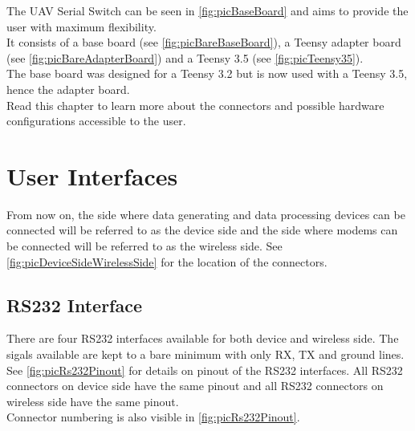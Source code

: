%
\label{sec:txtHwConfig}
%
%
%
%
The UAV Serial Switch can be seen in \autoref{fig:picBaseBoard} and aims to provide the user with maximum flexibility.\\
It consists of a base board (see \autoref{fig:picBareBaseBoard}), a Teensy adapter board (see \autoref{fig:picBareAdapterBoard}) and a Teensy 3.5 (see \autoref{fig:picTeensy35}).\\
The base board was designed for a Teensy 3.2 but is now used with a Teensy 3.5, hence the adapter board.\\
Read this chapter to learn more about the connectors and possible hardware configurations accessible to the user.
%
%
%
%
%
%
%
\section{User Interfaces}
%
From now on, the side where data generating and data processing devices can be connected will be referred to as the device side and the side where modems can be connected will be referred to as the wireless side. See \autoref{fig:picDeviceSideWirelessSide} for the location of the connectors.
%
%
\subsection{RS232 Interface}
%
There are four RS232 interfaces available for both device and wireless side. The sigals available are kept to a bare minimum with only RX, TX and ground lines. See \autoref{fig:picRs232Pinout} for details on pinout of the RS232 interfaces. All RS232 connectors on device side have the same pinout and all RS232 connectors on wireless side have the same pinout.\\
Connector numbering is also visible in \autoref{fig:picRs232Pinout}.
%
%
